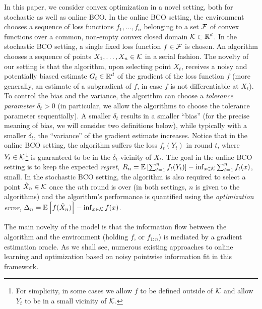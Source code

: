 In this paper, we consider convex optimization in a novel setting, both for stochastic as well as online BCO.
In the online BCO setting, the environment chooses a sequence of loss functions $f_1,\dots,f_n$ belonging to a set $\mathcal{F}$ of convex functions over a common, non-empty convex closed domain $\mathcal{K}\subset \mathbb{R}^d$.
In the stochastic BCO setting, a single fixed loss function $f\in \mathcal{F}$ is chosen.
An algorithm chooses a sequence of points $X_1,\dots,X_n\in \mathcal{K}$ in a serial fashion.
The novelty of our setting is that the algorithm, upon selecting point $X_t$, receives
a noisy and potentially biased estimate $G_t\in \mathbb{R}^d$
of the gradient of the loss function $f$
(more generally, an estimate of a subgradient of $f$, in case $f$ is not differentiable at $X_t$).
To control the bias and the variance, the algorithm can choose a \emph{tolerance parameter} $\delta_t>0$
(in particular, we allow the algorithms to choose the tolerance parameter sequentially).
A smaller $\delta_t$ results in a smaller ``bias'' (for the precise meaning of bias, we will consider two definitions below), while typically with a smaller $\delta_t$, the ``variance'' of the gradient estimate increases.
Notice that in the online BCO setting, the algorithm suffers the loss $f_t(Y_t)$ in round $t$, where $Y_t\in \mathcal{K}$\footnote{For simplicity, in some cases we allow $f$ to be defined outside of $\mathcal{K}$ and allow $Y_t$ to be in a small vicinity of $\mathcal{K}$.} is guaranteed to be in the $\delta_t$-vicinity of $X_t$.
The goal in the online BCO setting is to keep the expected \emph{regret},
	$R_n =\mathbb{E}\left[ \sum_{t=1}^n f_t(Y_t)\right] - \inf_{x\in \mathcal{K}} \sum_{t=1}^n f_t(x)$,
small.
In the stochastic BCO setting, the algorithm is also required to select a point $\hat{X}_n\in \mathcal{K}$ once
the $n$th round is over (in both settings, $n$ is given to the algorithms)
and the algorithm's performance is quantified using the \emph{optimization error},
$\Delta_n = \mathbb{E}\left[f(\hat{X}_n)\right] - \inf_{x\in \mathcal{K}} f(x) $.

The main novelty of the model is that the information flow between the algorithm and the environment (holding $f$, or $f_{1:n}$) is mediated by a gradient estimation oracle. As we shall see, numerous existing approaches to online learning and optimization based on noisy pointwise information fit in this framework.

